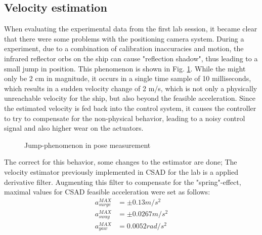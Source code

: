 
\subsection{Velocity estimation}
When evaluating the experimental data from the first lab session, it became clear that there were some problems with the positioning camera system. During a experiment, due to a combination of calibration inaccuracies and motion, the infrared reflector orbs on the ship can cause "reflection shadow", thus leading to a small jump in position. This phenomenon is shown in Fig. \ref{fig:measurements_spring}. While the might only be 2 cm in magnitude, it occurs in a single time sample of 10 milliseconds, which results in a sudden velocity change of 2 m/s, which is not only a physically unreachable velocity for the ship, but also beyond the feasible acceleration. Since the estimated velocity is fed back into the control system, it causes the controller to try to compensate for the non-physical behavior, leading to a noisy control signal and also higher wear on the actuators.   


\begin{figure}[!h]
    \centering
    \caption{ Jump-phenomenon in pose measurement}\label{fig:measurements_spring}
\end{figure}

The correct for this behavior, some changes to the estimator are done; 
The velocity estimator previously implemented in CSAD for the lab is a applied derivative filter. Augmenting this filter to compensate for the "spring"-effect, maximal values for CSAD feasible acceleration were set as follows: 
\begin{align}
    a_{surge}^{MAX} &= \pm 0.13 m/s^2 \\
    a_{sway}^{MAX} &= \pm 0.0267 m/s^2 \\
    a_{yaw}^{MAX} &= 0.0052 rad/s^2
\end{align}

